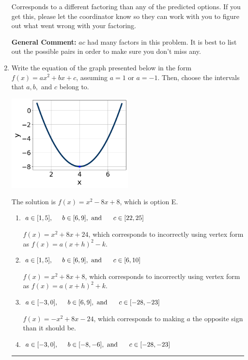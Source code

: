\documentclass{extbook}[14pt]
\newcommand{\litem}[1]{\item #1

\rule{\textwidth}{0.4pt}}
\begin{document}
\begin{enumerate}
{\begin{enumerate}[label=\Alph*.]
 Corresponds to a different factoring than any of the predicted options. If you get this, please let the coordinator know so they can work with you to figure out what went wrong with your factoring.
\end{enumerate}

\textbf{General Comment:} $ac$ had many factors in this problem. It is best to list out the possible pairs in order to make sure you don't miss any.
}
\litem{
Write the equation of the graph presented below in the form $f(x)=ax^2+bx+c$, assuming  $a=1$ or $a=-1$. Then, choose the intervals that $a, b,$ and $c$ belong to.

\begin{center}
    \includegraphics[width=0.5\textwidth]{../Figures/quadraticGraphToEquationCopyC.png}
\end{center}




The solution is \( f(x) = x^{2} -8 x + 8 \), which is option E.\begin{enumerate}[label=\Alph*.]
\item \( a \in [1, 5], \hspace*{5mm} b \in [6, 9], \text{ and } \hspace*{5mm} c \in [22, 25] \)

$f(x)=x^{2} +8 x + 24$, which corresponds to incorrectly using vertex form as $f(x) = a(x+h)^2 - k$.
\item \( a \in [1, 5], \hspace*{5mm} b \in [6, 9], \text{ and } \hspace*{5mm} c \in [6, 10] \)

$f(x)=x^{2} +8 x + 8$, which corresponds to incorrectly using vertex form as $f(x) = a(x+h)^2+k$.
\item \( a \in [-3, 0], \hspace*{5mm} b \in [6, 9], \text{ and } \hspace*{5mm} c \in [-28, -23] \)

$f(x)=-x^{2} +8 x -24$, which corresponds to making $a$ the opposite sign than it should be.
\item \( a \in [-3, 0], \hspace*{5mm} b \in [-8, -6], \text{ and } \hspace*{5mm} c \in [-28, -23] \)


\end{enumerate}}
\end{enumerate}
\end{document}
